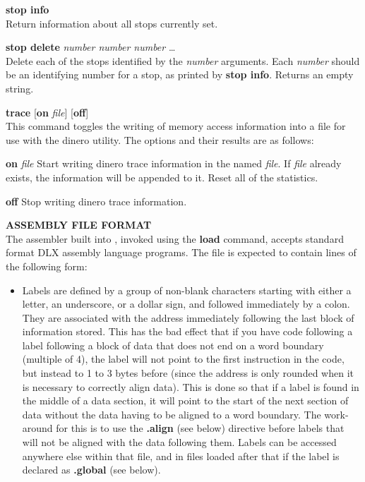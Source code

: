 \begin{mylist}
\begin{mylist}
\begin{mylist}
\item[{\bf stop info}]
\nopagebreak \hfill \\
Return information about all stops currently set.

\item[{\bf stop delete} {\em number number number} \ldots]
\nopagebreak \hfill \\
Delete each of the stops identified by the {\em number} arguments.
Each {\em number} should be an identifying number for a stop, as
printed by {\bf stop info}.  Returns an empty string.

\end{mylist}

\item[{\bf trace} {[}{\bf on} {\em file}{]} {[}{\bf off}{]}]
\nopagebreak \hfill \\
This command toggles the writing of memory access information into a
file for use with the dinero utility.  The options and their results
are as follows:

\begin{mylist}
\item[{\bf on} {\em file} \hfill]
Start writing dinero trace information in the named {\em file}.  If
{\em file} already exists, the information will be appended to it.
Reset all of the statistics.
\item[{\bf off} \hfill]
Stop writing dinero trace information.
\end{mylist}

\end{mylist}

\item[{\bf ASSEMBLY FILE FORMAT}]
\nopagebreak \hfill \\
The assembler built into \dlxsim, invoked using the {\bf load}
command, accepts standard format DLX assembly language programs.  The file is expected to contain lines of the following form:

\begin{itemize}
\item Labels are defined by a group of non-blank characters starting
with either a letter, an underscore, or a dollar sign, and followed
immediately by a colon.  They are associated with the address
immediately following the last block of information stored.  This has
the bad effect that if you have code following a label following a
block of data that does not end on a word boundary (multiple of 4),
the label will not point to the first instruction in the code, but
instead to 1 to 3 bytes before (since the address is only rounded when
it is necessary to correctly align data).  This is done so that if a
label is found in the middle of a data section, it will point to the
start of the next section of data without the data having to be
aligned to a word boundary.  The work-around for this is to use the
{\bf .align} (see below) directive before labels that will not be
aligned with the data following them.  Labels can be accessed anywhere
else within that file, and in files loaded after that if the label is
declared as {\bf .global} (see below).


\end{itemize}
\end{mylist}
